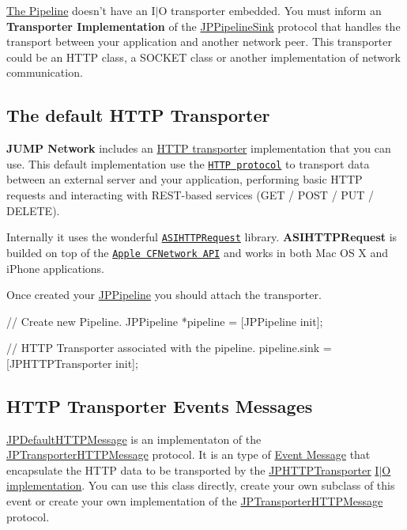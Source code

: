 \hyperlink{a00001}{The Pipeline} doesn't have an I$|$O transporter embedded. You must inform an {\bfseries Transporter Implementation} of the \hyperlink{a00034}{JPPipelineSink} protocol that handles the transport between your application and another network peer. This transporter could be an HTTP class, a SOCKET class or another implementation of network communication. 

\subsection*{The default HTTP Transporter}

{\bfseries JUMP Network} includes an \hyperlink{a00014}{HTTP transporter} implementation that you can use. This default implementation use the \href{http://es.wikipedia.org/wiki/Hypertext_Transfer_Protocol}{\tt HTTP protocol} to transport data between an external server and your application, performing basic HTTP requests and interacting with REST-\/based services (GET / POST / PUT / DELETE). 

Internally it uses the wonderful \href{http://allseeing-i.com/ASIHTTPRequest/}{\tt ASIHTTPRequest} library. {\bfseries ASIHTTPRequest} is builded on top of the \href{http://developer.apple.com/library/mac/#documentation/Networking/Conceptual/CFNetwork/Introduction/Introduction.html}{\tt Apple CFNetwork API} and works in both Mac OS X and iPhone applications. 

Once created your \hyperlink{a00019}{JPPipeline} you should attach the transporter. 
\begin{DoxyCode}
 // Create new Pipeline.
 JPPipeline *pipeline = [JPPipeline init];
 
 // HTTP Transporter associated with the pipeline.
 pipeline.sink = [JPHTTPTransporter init];
\end{DoxyCode}
 \subsection*{HTTP Transporter Events Messages}

\hyperlink{a00012}{JPDefaultHTTPMessage} is an implementaton of the \hyperlink{a00040}{JPTransporterHTTPMessage} protocol. It is an type of \hyperlink{a00006}{Event Message} that encapsulate the HTTP data to be transported by the \hyperlink{a00014}{JPHTTPTransporter} \hyperlink{a00002}{I$|$O implementation}. You can use this class directly, create your own subclass of this event or create your own implementation of the \hyperlink{a00040}{JPTransporterHTTPMessage} protocol. 

